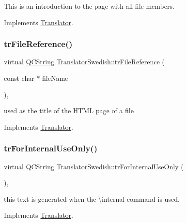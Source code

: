 This is an introduction to the page with all file members. 

Implements \mbox{\hyperlink{class_translator}{Translator}}.

\mbox{\label{class_translator_swedish_ae09bb24a0d49ac51e9cae1ec4b30a277}} 
\subsubsection{\texorpdfstring{trFileReference()}{trFileReference()}}
{\footnotesize\ttfamily virtual \mbox{\hyperlink{class_q_c_string}{Q\+C\+String}} Translator\+Swedish\+::tr\+File\+Reference (\begin{DoxyParamCaption}\item[{const char $\ast$}]{file\+Name }\end{DoxyParamCaption})\hspace{0.3cm}{\ttfamily [inline]}, {\ttfamily [virtual]}}

used as the title of the H\+T\+ML page of a file 

Implements \mbox{\hyperlink{class_translator}{Translator}}.

\mbox{\label{class_translator_swedish_a697a32b2c8b28e4838e2f59882f1c53a}} 
\subsubsection{\texorpdfstring{trForInternalUseOnly()}{trForInternalUseOnly()}}
{\footnotesize\ttfamily virtual \mbox{\hyperlink{class_q_c_string}{Q\+C\+String}} Translator\+Swedish\+::tr\+For\+Internal\+Use\+Only (\begin{DoxyParamCaption}{ }\end{DoxyParamCaption})\hspace{0.3cm}{\ttfamily [inline]}, {\ttfamily [virtual]}}

this text is generated when the \textbackslash{}internal command is used. 

Implements \mbox{\hyperlink{class_translator}{Translator}}.

\mbox{\label{class_translator_swedish_ad7eccd25d860f530bf53bea81da9d4d3}} 
